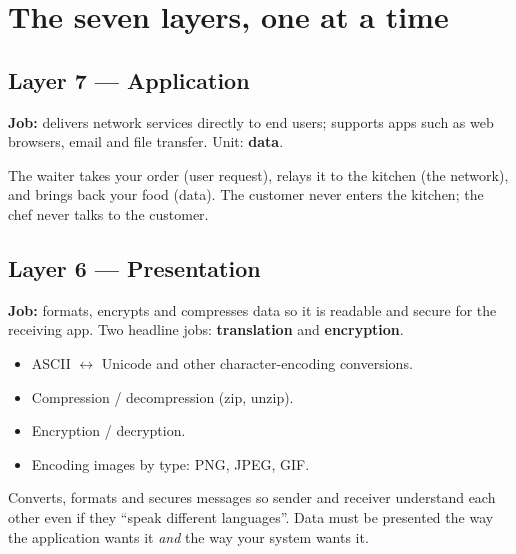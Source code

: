 \begin{center}
\end{center}

\section{The seven layers, one at a time}

\subsection{Layer 7 --- Application}
\textbf{Job:} delivers network services directly to end users; supports apps such as web browsers, email and file transfer. Unit: \textbf{data}.
\begin{analogy}[A waiter]
The waiter takes your order (user request), relays it to the kitchen (the network), and brings back your food (data). The customer never enters the kitchen; the chef never talks to the customer.
\end{analogy}

\subsection{Layer 6 --- Presentation}
\textbf{Job:} formats, encrypts and compresses data so it is readable and secure for the receiving app. Two headline jobs: \textbf{translation} and \textbf{encryption}.
\begin{itemize}
  \item ASCII $\leftrightarrow$ Unicode and other character-encoding conversions.
  \item Compression / decompression (zip, unzip).
  \item Encryption / decryption.
  \item Encoding images by type: PNG, JPEG, GIF.
\end{itemize}
\begin{analogy}[A translator]
Converts, formats and secures messages so sender and receiver understand each other even if they ``speak different languages''. Data must be presented the way the application wants it \emph{and} the way your system wants it.
\end{analogy}

